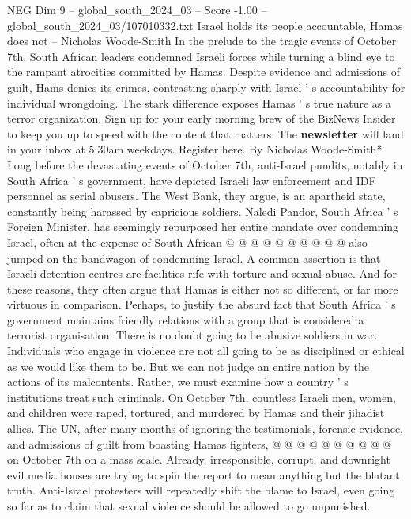 \begin{textsample}{NEG Dim 9 – global\_south\_2024\_03 – Score -1.00 – global\_south\_2024\_03/107010332.txt}  \label{ex:f9_neg_409}
Israel holds its people accountable, Hamas does not -- Nicholas Woode-Smith In the prelude to the tragic events of October 7th, South African leaders condemned Israeli forces while turning a blind eye to the rampant atrocities committed by Hamas.
Despite evidence and admissions of guilt, Hams denies its crimes, contrasting sharply with Israel ' s accountability for individual wrongdoing.
The stark difference exposes Hamas ' s true nature as a terror organization.
Sign up for your early morning brew of the BizNews Insider to keep you up to speed with the content that matters.
The \textbf{newsletter} will land in your inbox at 5:30am weekdays.
Register here.
By Nicholas Woode-Smith* Long before the devastating events of October 7th, anti-Israel pundits, notably in South Africa ' s government, have depicted Israeli law enforcement and IDF personnel as serial abusers.
The West Bank, they argue, is an apartheid state, constantly being harassed by capricious soldiers.
Naledi Pandor, South Africa ' s Foreign Minister, has seemingly repurposed her entire mandate over condemning Israel, often at the expense of South African @ @ @ @ @ @ @ @ @ @ also jumped on the bandwagon of condemning Israel.
A common assertion is that Israeli detention centres are facilities rife with torture and sexual abuse.
And for these reasons, they often argue that Hamas is either not so different, or far more virtuous in comparison.
Perhaps, to justify the absurd fact that South Africa ' s government maintains friendly relations with a group that is considered a terrorist organisation.
There is no doubt going to be abusive soldiers in war.
Individuals who engage in violence are not all going to be as disciplined or ethical as we would like them to be.
But we can not judge an entire nation by the actions of its malcontents.
Rather, we must examine how a country ' s institutions treat such criminals.
On October 7th, countless Israeli men, women, and children were raped, tortured, and murdered by Hamas and their jihadist allies.
The UN, after many months of ignoring the testimonials, forensic evidence, and admissions of guilt from boasting Hamas fighters, @ @ @ @ @ @ @ @ @ @ on October 7th on a mass scale.
Already, irresponsible, corrupt, and downright evil media houses are trying to spin the report to mean anything but the blatant truth.
Anti-Israel protesters will repeatedly shift the blame to Israel, even going so far as to claim that sexual violence should be allowed to go unpunished.

\end{textsample}
